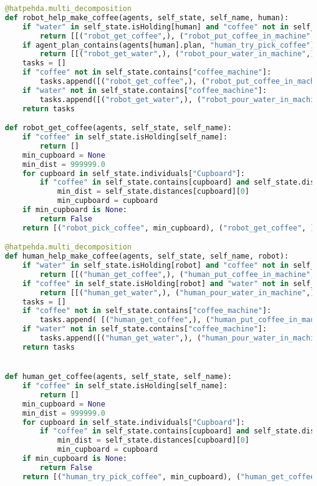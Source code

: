 \begin{lstlisting}[language=Python]
@hatpehda.multi_decomposition
def robot_help_make_coffee(agents, self_state, self_name, human):
    if "water" in self_state.isHolding[human] and "coffee" not in self_state.contains["coffee_machine"]:
        return [[("robot_get_coffee",), ("robot_put_coffee_in_machine",)]]
    if agent_plan_contains(agents[human].plan, "human_try_pick_coffee") and "water" not in self_state.contains["coffee_machine"]:
        return [[("robot_get_water",), ("robot_pour_water_in_machine",)]]
    tasks = []
    if "coffee" not in self_state.contains["coffee_machine"]:
        tasks.append([("robot_get_coffee",), ("robot_put_coffee_in_machine",), ("robot_help_make_coffee", human)])
    if "water" not in self_state.contains["coffee_machine"]:
        tasks.append([("robot_get_water",), ("robot_pour_water_in_machine",), ("robot_help_make_coffee", human)])
    return tasks

def robot_get_coffee(agents, self_state, self_name):
    if "coffee" in self_state.isHolding[self_name]:
        return []
    min_cupboard = None
    min_dist = 999999.0
    for cupboard in self_state.individuals["Cupboard"]:
        if "coffee" in self_state.contains[cupboard] and self_state.distances[cupboard][0] < min_dist:
            min_dist = self_state.distances[cupboard][0]
            min_cupboard = cupboard
    if min_cupboard is None:
        return False
    return [("robot_pick_coffee", min_cupboard), ("robot_get_coffee", )]

@hatpehda.multi_decomposition
def human_help_make_coffee(agents, self_state, self_name, robot):
    if "water" in self_state.isHolding[robot] and "coffee" not in self_state.contains["coffee_machine"]:
        return [[("human_get_coffee",), ("human_put_coffee_in_machine",)]]
    if "coffee" in self_state.isHolding[robot] and "water" not in self_state.contains["coffee_machine"]:
        return [[("human_get_water",), ("human_pour_water_in_machine",)]]
    tasks = []
    if "coffee" not in self_state.contains["coffee_machine"]:
        tasks.append( [("human_get_coffee",), ("human_put_coffee_in_machine",), ("human_help_make_coffee", robot)])
    if "water" not in self_state.contains["coffee_machine"]:
        tasks.append([("human_get_water",), ("human_pour_water_in_machine",), ("human_help_make_coffee", robot)])
    return tasks


def human_get_coffee(agents, self_state, self_name):
    if "coffee" in self_state.isHolding[self_name]:
        return []
    min_cupboard = None
    min_dist = 999999.0
    for cupboard in self_state.individuals["Cupboard"]:
        if "coffee" in self_state.contains[cupboard] and self_state.distances[cupboard][0] < min_dist:
            min_dist = self_state.distances[cupboard][0]
            min_cupboard = cupboard
    if min_cupboard is None:
        return False
    return [("human_try_pick_coffee", min_cupboard), ("human_get_coffee",)]



\end{lstlisting}
